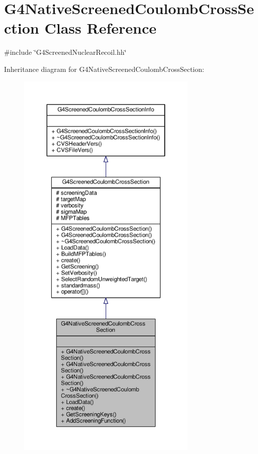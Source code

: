\hypertarget{classG4NativeScreenedCoulombCrossSection}{}\section{G4\+Native\+Screened\+Coulomb\+Cross\+Section Class Reference}
\label{classG4NativeScreenedCoulombCrossSection}


{\ttfamily \#include \char`\"{}G4\+Screened\+Nuclear\+Recoil.\+hh\char`\"{}}



Inheritance diagram for G4\+Native\+Screened\+Coulomb\+Cross\+Section\+:
\nopagebreak
\begin{figure}[H]
\begin{center}
\leavevmode
\includegraphics[height=550pt]{classG4NativeScreenedCoulombCrossSection__inherit__graph}
\end{center}
\end{figure}


